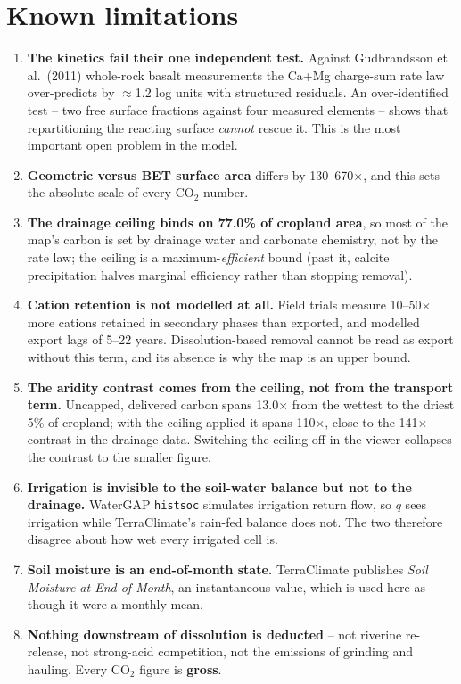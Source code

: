 \documentclass[11pt,a4paper]{article}
\newcommand{\cotwo}{\ensuremath{\mathrm{CO_2}}}
\begin{document}
\section{Known limitations}
\label{sec:limits}

\begin{enumerate}
\item \textbf{The kinetics fail their one independent test.} Against Gudbrandsson
et al.\ (2011) whole-rock basalt measurements the Ca+Mg charge-sum rate law
over-predicts by $\approx$1.2 log units with structured residuals. An
over-identified test -- two free surface fractions against four measured elements
-- shows that repartitioning the reacting surface \emph{cannot} rescue it. This is
the most important open problem in the model.
\item \textbf{Geometric versus BET surface area} differs by 130--670$\times$, and
this sets the absolute scale of every \cotwo{} number.
\item \textbf{The drainage ceiling binds on 77.0\% of cropland area},
so most of the map's carbon is set by drainage water and carbonate chemistry, not
by the rate law; the ceiling is a maximum-\emph{efficient} bound (past it,
calcite precipitation halves marginal efficiency rather than stopping removal).
\item \textbf{Cation retention is not modelled at all.} Field trials measure
10--50$\times$ more cations retained in secondary phases than exported, and modelled
export lags of 5--22 years. Dissolution-based removal cannot be read as export
without this term, and its absence is why the map is an upper bound.
\item \textbf{The aridity contrast comes from the ceiling, not from the
transport term.} Uncapped, delivered carbon spans 13.0$\times$ from the
wettest to the driest 5\% of cropland; with the ceiling applied it spans
110$\times$, close to the 141$\times$ contrast in the drainage
data. Switching the ceiling off in the viewer collapses the contrast to the
smaller figure.
\item \textbf{Irrigation is invisible to the soil-water balance but not to the
drainage.} WaterGAP \texttt{histsoc} simulates irrigation return flow, so $q$
sees irrigation while TerraClimate's rain-fed balance does not. The two therefore
disagree about how wet every irrigated cell is.
\item \textbf{Soil moisture is an end-of-month state.} TerraClimate publishes
\emph{Soil Moisture at End of Month}, an instantaneous value, which is used here
as though it were a monthly mean.
\item \textbf{Nothing downstream of dissolution is deducted} -- not riverine
re-release, not strong-acid competition, not the emissions of grinding and
hauling. Every \cotwo{} figure is \textbf{gross}.
\end{enumerate}
\end{document}
